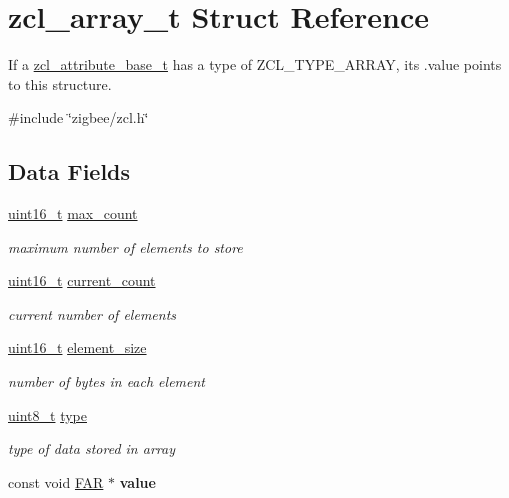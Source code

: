 \hypertarget{structzcl__array__t}{}\section{zcl\+\_\+array\+\_\+t Struct Reference}
\label{structzcl__array__t}


If a \hyperlink{structzcl__attribute__base__t}{zcl\+\_\+attribute\+\_\+base\+\_\+t} has a type of Z\+C\+L\+\_\+\+T\+Y\+P\+E\+\_\+\+A\+R\+R\+AY, its .value points to this structure.  




{\ttfamily \#include \char`\"{}zigbee/zcl.\+h\char`\"{}}

\subsection*{Data Fields}
\begin{DoxyCompactItemize}
\item 
\hyperlink{group__hal__dos_ga5a8b2dc9e45a9ee81a94ef304fb62505}{uint16\+\_\+t} \hyperlink{group__zcl_ga7b50573c335728800d65f3fb5479f9bc}{max\+\_\+count}
\begin{DoxyCompactList}\small\item\em maximum number of elements to store \end{DoxyCompactList}\item 
\hyperlink{group__hal__dos_ga5a8b2dc9e45a9ee81a94ef304fb62505}{uint16\+\_\+t} \hyperlink{group__zcl_gaf83468db7e4fc12ef11ded6f62ffe7f8}{current\+\_\+count}
\begin{DoxyCompactList}\small\item\em current number of elements \end{DoxyCompactList}\item 
\hyperlink{group__hal__dos_ga5a8b2dc9e45a9ee81a94ef304fb62505}{uint16\+\_\+t} \hyperlink{group__zcl_ga16152e39a199182441f04a3360c45657}{element\+\_\+size}
\begin{DoxyCompactList}\small\item\em number of bytes in each element \end{DoxyCompactList}\item 
\hyperlink{group__hal__dos_gae1affc9ca37cfb624959c866a73f83c2}{uint8\+\_\+t} \hyperlink{group__zcl_ga1d127017fb298b889f4ba24752d08b8e}{type}
\begin{DoxyCompactList}\small\item\em type of data stored in array \end{DoxyCompactList}\item 
const void \hyperlink{group__hal_gaef060b3456fdcc093a7210a762d5f2ed}{F\+AR} $\ast$ {\bfseries value}
\end{DoxyCompactItemize}


